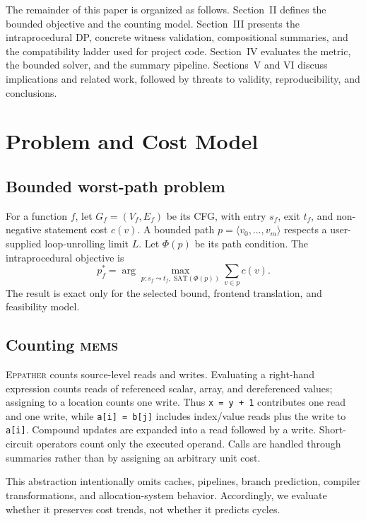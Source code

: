 \documentclass[10pt,conference]{IEEEtran}
\newcommand{\mems}{\textsc{mems}\xspace}
\newcommand{\tool}{\textsc{Eppather}\xspace}
\newcommand{\code}[1]{\texttt{#1}}
\begin{document}
The remainder of this paper is organized as follows. Section~II defines the bounded objective and the counting model. Section~III presents the intraprocedural DP, concrete witness validation, compositional summaries, and the compatibility ladder used for project code. Section~IV evaluates the metric, the bounded solver, and the summary pipeline. Sections~V and VI discuss implications and related work, followed by threats to validity, reproducibility, and conclusions.

\section{Problem and Cost Model}
\subsection{Bounded worst-path problem}
For a function $f$, let $G_f=(V_f,E_f)$ be its CFG, with entry $s_f$, exit $t_f$, and non-negative statement cost $c(v)$. A bounded path $p=\langle v_0,\ldots,v_m\rangle$ respects a user-supplied loop-unrolling limit $L$. Let $\Phi(p)$ be its path condition. The intraprocedural objective is
\begin{equation}
 p_f^*=\arg\max_{p:s_f\leadsto t_f,\;\mathrm{SAT}(\Phi(p))}\sum_{v\in p}c(v).
 \label{eq:objective}
\end{equation}
The result is exact only for the selected bound, frontend translation, and feasibility model.

\subsection{Counting \mems}
\tool counts source-level reads and writes. Evaluating a right-hand expression counts reads of referenced scalar, array, and dereferenced values; assigning to a location counts one write. Thus \code{x = y + 1} contributes one read and one write, while \code{a[i] = b[j]} includes index/value reads plus the write to \code{a[i]}. Compound updates are expanded into a read followed by a write. Short-circuit operators count only the executed operand. Calls are handled through summaries rather than by assigning an arbitrary unit cost.

This abstraction intentionally omits caches, pipelines, branch prediction, compiler transformations, and allocation-system behavior. Accordingly, we evaluate whether it preserves cost trends, not whether it predicts cycles.
\end{document}
